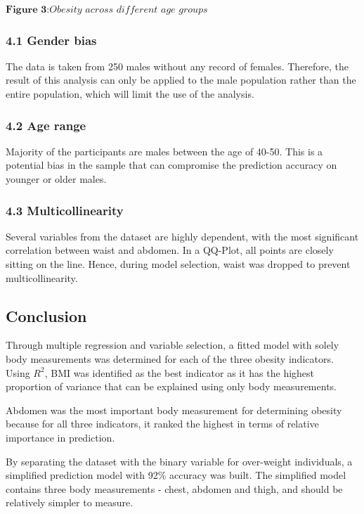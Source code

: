 \documentclass[a4paper,9pt,twocolumn,twoside,]{pinp}
\begin{document}
\(\textbf{Figure 3:}\textit{Obesity across different age groups}\)

\hypertarget{gender-bias}{%
\subsubsection{4.1 Gender bias}\label{gender-bias}}

The data is taken from 250 males without any record of females.
Therefore, the result of this analysis can only be applied to the male
population rather than the entire population, which will limit the use
of the analysis.

\hypertarget{age-range}{%
\subsubsection{4.2 Age range}\label{age-range}}

Majority of the participants are males between the age of 40-50. This is
a potential bias in the sample that can compromise the prediction
accuracy on younger or older males.

\hypertarget{multicollinearity}{%
\subsubsection{4.3 Multicollinearity}\label{multicollinearity}}

Several variables from the dataset are highly dependent, with the most
significant correlation between waist and abdomen. In a QQ-Plot, all
points are closely sitting on the line. Hence, during model selection,
waist was dropped to prevent multicollinearity.

\hypertarget{conclusion}{%
\subsection{Conclusion}\label{conclusion}}

Through multiple regression and variable selection, a fitted model with
solely body measurements was determined for each of the three obesity
indicators. Using \(R^2\), BMI was identified as the best indicator as
it has the highest proportion of variance that can be explained using
only body measurements.

Abdomen was the most important body measurement for determining obesity
because for all three indicators, it ranked the highest in terms of
relative importance in prediction.

By separating the dataset with the binary variable for over-weight
individuals, a simplified prediction model with 92\% accuracy was built.
The simplified model contains three body measurements - chest, abdomen
and thigh, and should be relatively simpler to measure.
\end{document}
